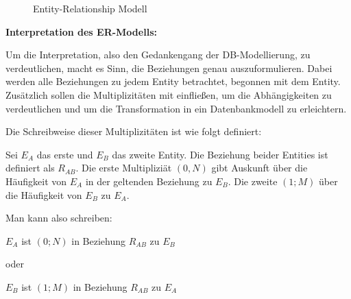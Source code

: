 \begin{center}
\begin{figure}[H]
{
}
\caption[\textbf{Entity-Relationship Modell}]{Entity-Relationship Modell}
\label{fig:ERModell}
\end{figure}
\end{center}

\textbf{Interpretation des \ac{ER-Modell}s:}

Um die Interpretation, also den Gedankengang der \ac{DB}-Modellierung, zu verdeutlichen, macht es Sinn, die Beziehungen genau auszuformulieren.
Dabei werden alle Beziehungen zu jedem Entity betrachtet, begonnen mit dem Entity.
Zusätzlich sollen die Multiplizitäten mit einfließen, um die Abhängigkeiten zu verdeutlichen und um die Transformation in ein Datenbankmodell zu erleichtern.

Die Schreibweise dieser Multiplizitäten ist wie folgt definiert:

Sei $E_{A}$ das erste und $E_{B}$ das zweite Entity.
Die Beziehung beider Entities ist definiert als $R_{AB}$. 
Die erste Multipliziät $(0,N)$ gibt Auskunft über die Häufigkeit von $E_{A}$ in der geltenden Beziehung zu $E_{B}$.
Die zweite $(1;M)$ über die Häufigkeit von $E_{B}$ zu $E_{A}$.

Man kann also schreiben:

\begin{center}
$E_{A}$ ist $(0;N)$ in Beziehung $R_{AB}$ zu $E_{B}$

oder

$E_{B}$ ist $(1;M)$ in Beziehung $R_{AB}$ zu $E_{A}$
\end{center}

